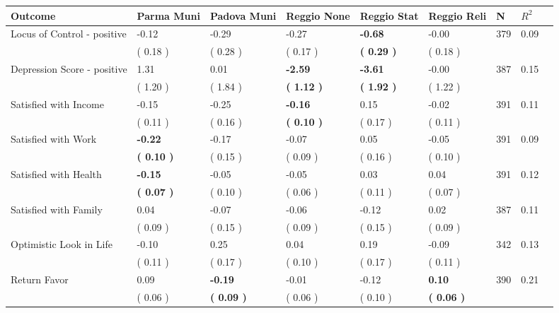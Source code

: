 \begin{tabular}{L{6.2cm} C{1.8cm} C{1.8cm} C{1.8cm} C{1.8cm} C{1.8cm} C{1.8cm} C{0.3cm} C{0.3cm}}
\toprule
 \textbf{Outcome} & \textbf{Parma Muni} & \textbf{Padova Muni} & \textbf{Reggio None} & \textbf{Reggio Stat} & \textbf{Reggio Reli} & \textbf{N} & \textbf{$ R^2$} \\
\midrule
Locus of Control - positive &     -0.12 &     -0.29 &     -0.27 & \textbf{    -0.68} &     -0.00  & 379 &       0.09 \\ 
 & (     0.18 ) & (     0.28 ) & (     0.17 ) & \textbf{(     0.29 )} & (     0.18 )  & \\
Depression Score - positive &      1.31 &      0.01 & \textbf{    -2.59} & \textbf{    -3.61} &     -0.00  & 387 &       0.15 \\ 
 & (     1.20 ) & (     1.84 ) & \textbf{(     1.12 )} & \textbf{(     1.92 )} & (     1.22 )  & \\
Satisfied with Income &     -0.15 &     -0.25 & \textbf{    -0.16} &      0.15 &     -0.02  & 391 &       0.11 \\ 
 & (     0.11 ) & (     0.16 ) & \textbf{(     0.10 )} & (     0.17 ) & (     0.11 )  & \\
Satisfied with Work & \textbf{    -0.22} &     -0.17 &     -0.07 &      0.05 &     -0.05  & 391 &       0.09 \\ 
 & \textbf{(     0.10 )} & (     0.15 ) & (     0.09 ) & (     0.16 ) & (     0.10 )  & \\
Satisfied with Health & \textbf{    -0.15} &     -0.05 &     -0.05 &      0.03 &      0.04  & 391 &       0.12 \\ 
 & \textbf{(     0.07 )} & (     0.10 ) & (     0.06 ) & (     0.11 ) & (     0.07 )  & \\
Satisfied with Family &      0.04 &     -0.07 &     -0.06 &     -0.12 &      0.02  & 387 &       0.11 \\ 
 & (     0.09 ) & (     0.15 ) & (     0.09 ) & (     0.15 ) & (     0.09 )  & \\
Optimistic Look in Life &     -0.10 &      0.25 &      0.04 &      0.19 &     -0.09  & 342 &       0.13 \\ 
 & (     0.11 ) & (     0.17 ) & (     0.10 ) & (     0.17 ) & (     0.11 )  & \\
Return Favor &      0.09 & \textbf{    -0.19} &     -0.01 &     -0.12 & \textbf{     0.10}  & 390 &       0.21 \\ 
 & (     0.06 ) & \textbf{(     0.09 )} & (     0.06 ) & (     0.10 ) & \textbf{(     0.06 )}  & \\

\end{tabular}
